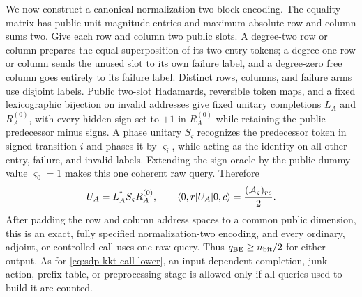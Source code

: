 We now construct a canonical normalization-two block encoding.  The equality
matrix has public unit-magnitude entries and maximum absolute row and column
sums two.  Give each row and column two public slots.  A degree-two row or
column prepares the equal superposition of its two entry tokens; a degree-one
row or column sends the unused slot to its own failure label, and a degree-zero
free column goes entirely to its failure label.  Distinct rows, columns, and
failure arms use disjoint labels.  Public two-slot Hadamards, reversible token
maps, and a fixed lexicographic bijection on invalid addresses give fixed
unitary completions $L_A$ and $R_A^{(0)}$, with every hidden sign set to
$+1$ in $R_A^{(0)}$ while retaining the public predecessor minus signs.  A
phase unitary $S_\varsigma$ recognizes the predecessor token in
signed transition $i$ and phases it by $\varsigma_i$, while acting as the
identity on all other entry, failure, and invalid labels.  Extending the sign
oracle by the public dummy value $\varsigma_0=1$ makes this one coherent raw
query.  Therefore
\begin{equation}
 U_A=L_A^\dagger S_\varsigma R_A^{(0)},\qquad
 \langle 0,r\rvert U_A\lvert 0,c\rangle=\frac{(\mathcal A_\varsigma)_{rc}}2.              \label{eq:sdp-schur-canonical-be}
\end{equation}
After padding the row and column address spaces to a common public dimension,
this is an exact, fully specified normalization-two encoding, and every ordinary,
adjoint, or controlled call uses one raw query.  Thus
$q_{\rm BE}\geq n_{\rm bit}/2$ for either output.  As for \eqref{eq:sdp-kkt-call-lower}, an
input-dependent completion, junk action, prefix table, or preprocessing stage
is allowed only if all queries used to build it are counted.

